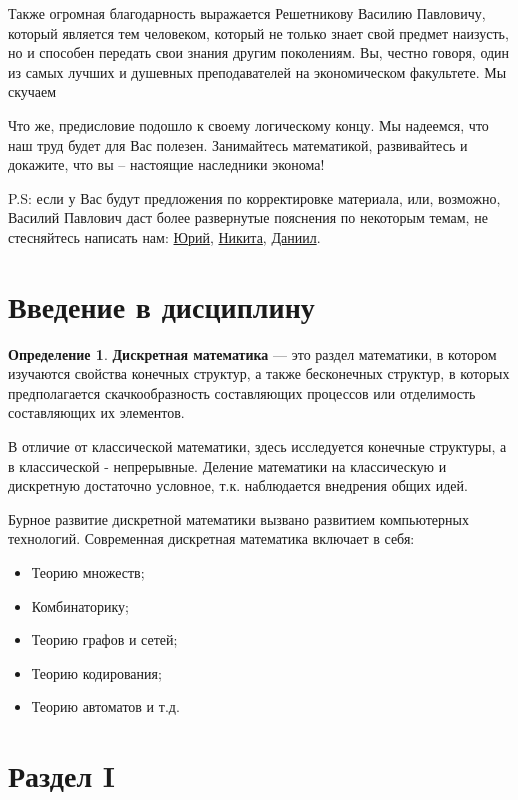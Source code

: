 \documentclass[12pt, a4paper, oneside]{article}
\theoremstyle{plain} %
\theoremstyle{definition}
\newtheorem*{definition}{Определение}  %
\newcommand{\indef}[1]{\textbf{ \color{dark_red} #1}}
\begin{document}
Также огромная благодарность выражается Решетникову Василию Павловичу, который является тем человеком, который не только знает свой предмет наизусть, но и способен передать свои знания другим поколениям. Вы, честно говоря, один из самых лучших и душевных преподавателей на экономическом факультете. Мы скучаем
\Heart \Heart \Heart 


Что же, предисловие подошло к своему логическому концу. Мы надеемся, что наш труд будет для Вас полезен. Занимайтесь математикой, развивайтесь и докажите, что вы – настоящие наследники эконома!


P.S: если у Вас будут предложения по корректировке материала, или, возможно, Василий Павлович даст более развернутые пояснения по некоторым темам, не стесняйтесь написать нам: \href{https://vk.com/penzenskiy_ds}{Юрий}, \href{https://vk.com/k.onill}{Никита},  \href{https://vk.com/surealrzdnt}{Даниил}. 


\hspace{1mm} \section*{Введение в дисциплину}

\begin{definition}
\indef{Дискретная математика} --- это раздел математики, в котором изучаются свойства конечных структур, а также бесконечных структур, в которых предполагается скачкообразность составляющих процессов или отделимость составляющих их элементов.
\end{definition}

В отличие от классической математики, здесь исследуется конечные структуры, 
а в классической - непрерывные. Деление математики на классическую и дискретную достаточно условное, т.к. наблюдается внедрения общих идей.

Бурное развитие дискретной математики вызвано развитием компьютерных технологий.
Современная дискретная математика включает в себя:
  
\begin{itemize}
    \item Теорию множеств;  
    \item Комбинаторику;        
    \item Теорию графов и сетей;
    \item Теорию кодирования;
    \item Теорию автоматов и т.д.
\end{itemize}

\section*{\textbf{Раздел I}}
\end{document}
